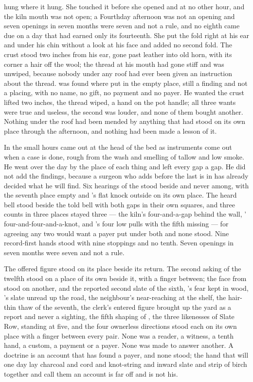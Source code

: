  hung where it hung. She touched it before she opened  and at no other hour, and the kiln mouth was not open; a Fourthday afternoon was not an opening and seven openings in seven months were seven and not a rule, and no eighth came due on a day that had earned only its fourteenth. She put the fold right at his ear and under his chin without a look at his face and added no second fold. The crust stood two inches from his ear, gone past leather into old horn, with its corner a hair off the wool; the thread at his mouth had gone stiff and was unwiped, because nobody under any roof had ever been given an instruction about the thread.  was found where put in the empty place, still a finding and not a placing, with no name, no gift, no payment and no payer. He wanted the crust lifted two inches, the thread wiped, a hand on the pot handle; all three wants were true and useless, the second was louder, and none of them bought another. Nothing under the roof had been mended by anything that had stood on its own place through the afternoon, and nothing had been made a lesson of it.

\scenebreak

In the small hours  came out at the head of the bed as instruments come out when a case is done, rough from the wash and smelling of tallow and low smoke. He went over the day by the place of each thing and left every gap a gap. He did not add the findings, because a surgeon who adds before the last is in has already decided what he will find. Six hearings of the  stood beside and never among, with the seventh place empty and 's flat knock outside on its own place. The heard bell stood beside the told bell with both gaps in their own squares, and three counts in three places stayed three --- the kiln's four-and-a-gap behind the wall, ' four-and-four-and-a-knot, and 's four low pulls with the fifth missing --- for agreeing any two would want a payer put under both and none stood. Nine record-first hands stood with nine stoppings and no tenth. Seven openings in seven months were seven and not a rule.

The offered figure stood on its place beside its return. The second asking of the twelfth stood on a place of its own beside it, with a finger between; the face from  stood on another, and the reported second slate of the sixth, 's fear kept in wood, 's slate unread up the road, the neighbour's near-reaching at the shelf, the hair-thin thaw of the seventh, the clerk's entered figure brought up the yard as a report and never a sighting, the fifth shaping of , the three likenesses of Slate Row,  standing at five, and the four ownerless directions stood each on its own place with a finger between every pair. None was a reader, a witness, a tenth hand, a custom, a payment or a payer. None was made to answer another. A doctrine is an account that has found a payer, and none stood; the hand that will one day lay charcoal and cord and knot-string and inward slate and strip of birch together and call them an account is far off and is not his.

